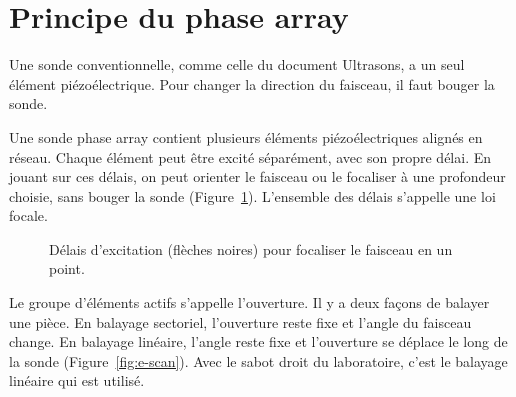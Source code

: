 \documentclass[11pt,letterpaper]{article}
\begin{document}
\section{Principe du phase array}
\label{sec:theorie}

Une sonde conventionnelle, comme celle du document Ultrasons, a un seul \'el\'ement pi\'ezo\'electrique. Pour changer la direction du faisceau, il faut bouger la sonde.

Une sonde phase array contient plusieurs \'el\'ements pi\'ezo\'electriques align\'es en r\'eseau. Chaque \'el\'ement peut \^etre excit\'e s\'epar\'ement, avec son propre d\'elai. En jouant sur ces d\'elais, on peut orienter le faisceau ou le focaliser \`a une profondeur choisie, sans bouger la sonde (Figure~\ref{fig:loi-focale}). L'ensemble des d\'elais s'appelle une loi focale.

\begin{figure}[H]
\centering
{}
\caption{D\'elais d'excitation (fl\`eches noires) pour focaliser le faisceau en un point.}
\label{fig:loi-focale}
\end{figure}

Le groupe d'\'el\'ements actifs s'appelle l'ouverture. Il y a deux fa\c cons de balayer une pi\`ece. En balayage sectoriel, l'ouverture reste fixe et l'angle du faisceau change. En balayage lin\'eaire, l'angle reste fixe et l'ouverture se d\'eplace le long de la sonde (Figure~\ref{fig:e-scan}). Avec le sabot droit du laboratoire, c'est le balayage lin\'eaire qui est utilis\'e.
\end{document}
